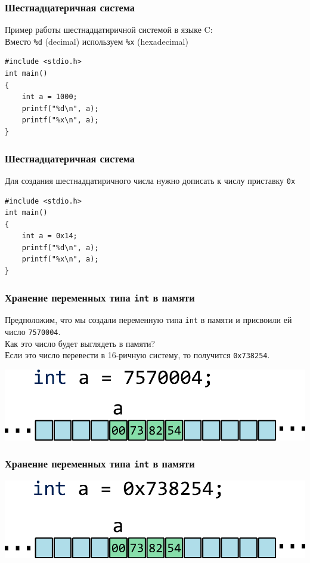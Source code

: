 \documentclass[10pt,pdf,hyperref={unicode}]{beamer}
\begin{document}
\begin{frame}[fragile]
\frametitle{Шестнадцатеричная система} 
Пример работы шестнадцатиричной системой в языке C:\\
Вместо \texttt{\%d} (decimal) используем \texttt{\%x} (hexadecimal)
\begin{lstlisting}
#include <stdio.h>
int main()
{
	int a = 1000;
	printf("%d\n", a);
	printf("%x\n", a);
}
\end{lstlisting}
\end{frame}

\begin{frame}[fragile]
\frametitle{Шестнадцатеричная система} 
Для создания шестнадцатиричного числа нужно дописать 
к числу приставку \texttt{0x}
\begin{lstlisting}
#include <stdio.h>
int main()
{
	int a = 0x14;
	printf("%d\n", a);
	printf("%x\n", a);
}
\end{lstlisting}
\end{frame}

\begin{frame}[fragile]
\frametitle{Хранение переменных типа \texttt{int} в памяти}
Предположим, что мы создали переменную типа \texttt{int} в памяти и присвоили ей число \texttt{7570004}.\\
Как это число будет выглядеть в памяти?\\
Если это число перевести в 16-ричную систему, то получится \texttt{0x738254}.
\begin{center}
\includegraphics[width=0.72\linewidth]{../images/memory/memory_0_int_dec.png}
\end{center}
\end{frame}

\begin{frame}[fragile]
\frametitle{Хранение переменных типа \texttt{int} в памяти} 
\begin{center}
\includegraphics[width=0.72\linewidth]{../images/memory/memory_0_int_hex.png}
\end{center}
\end{frame}
\end{document}
